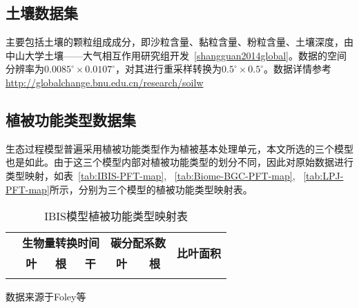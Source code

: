 \subsection{土壤数据集}
主要包括土壤的颗粒组成成分，即沙粒含量、黏粒含量、粉粒含量、土壤深度，由中山大学土壤——大气相互作用研究组开发~\ref{shangguan2014global}。数据的空间分辨率为$0.0085^{\circ} \times 0.0107^{\circ}$，对其进行重采样转换为$0.5^{\circ} \times 0.5^{\circ}$。数据详情参考 \href{http://globalchange.bnu.edu.cn/research/soilw}{http://globalchange.bnu.edu.cn/research/soilw}

\subsection{植被功能类型数据集}
生态过程模型普遍采用植被功能类型作为植被基本处理单元，本文所选的三个模型也是如此。由于这三个模型内部对植被功能类型的划分不同，因此对原始数据进行类型映射，如表~\ref{tab:IBIS-PFT-map}, ~\ref{tab:Biome-BGC-PFT-map}, ~\ref{tab:LPJ-PFT-map}所示，分别为三个模型的植被功能类型映射表。

\begin{table}[!htbp]
    \centering
    \caption{IBIS模型植被功能类型映射表}
    \label{tab:IBIB-PFT-map}
    \begin{threeparttable}
        \begin{tabular}{lcccccc}
            \Xhline{1.5pt}
            \multirow{2}{*}{\textbf{植被功能类型}} & \multicolumn{3}{c}{\textbf{生物量转换时间}} & \multicolumn{2}{c}{\textbf{碳分配系数}} & \multirow{2}{*}{\textbf{比叶面积}} \\ 
            \cline{2-4} \cline{5-6}
            & \textbf{叶} & \textbf{根} & \textbf{干} & \textbf{叶} & \textbf{根} &  \\ 
            \Xhline{1.5pt}
            \Xhline{1.5pt}
        \end{tabular}
        \begin{tablenotes}
            \footnotesize
            \item[]数据来源于Foley等~\cite{foley1996integrated}
        \end{tablenotes}
    \end{threeparttable}
\end{table}

